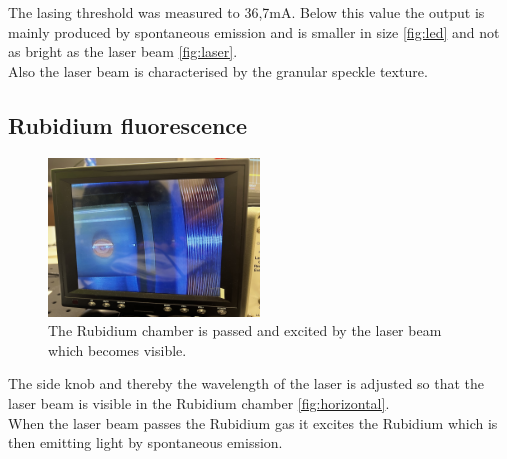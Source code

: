The lasing threshold was measured to 36,7mA. Below this value the output is mainly produced by spontaneous emission and 
is smaller in size \autoref{fig:led} and not as bright as the laser beam \autoref{fig:laser}. \\
Also the laser beam is characterised by the granular \grqq speckle\grqq{} texture. 





\subsection{Rubidium fluorescence}

\begin{figure}
  \centering
  \includegraphics[width=0.5\textwidth]{content/horizontal.jpg}
  \caption{The Rubidium chamber is passed and excited by the laser beam which becomes visible.}
  \label{fig:horizontal}
\end{figure}

The side knob and thereby the wavelength of the laser is adjusted so that the laser beam is visible in the Rubidium chamber \autoref{fig:horizontal}.\\
When the laser beam passes the Rubidium gas it excites the Rubidium which is then emitting light by spontaneous emission. 








